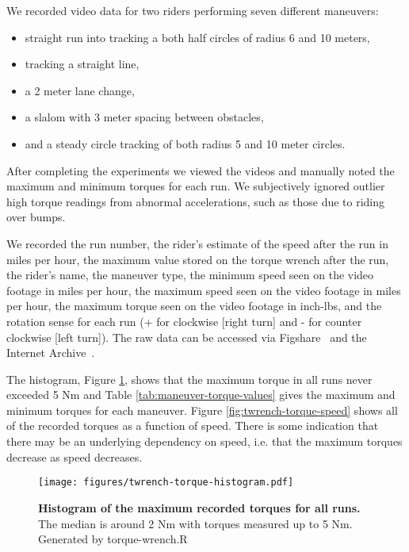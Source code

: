 \documentclass[10pt]{article}
\begin{document}
We recorded video data for two riders performing seven different maneuvers:

\begin{itemize}
  \item straight run into tracking a both half circles of radius 6 and 10
    meters,
  \item tracking a straight line,
  \item a 2 meter lane change,
  \item a slalom with 3 meter spacing between obstacles,
  \item and a steady circle tracking of both radius 5 and 10 meter circles.
\end{itemize}

After completing the experiments we viewed the videos and manually noted the
maximum and minimum torques for each run. We subjectively ignored outlier high
torque readings from abnormal accelerations, such as those due to riding over
bumps.

We recorded the run number, the rider’s estimate of the speed after the run in
miles per hour, the maximum value stored on the torque wrench after the run,
the rider’s name, the maneuver type, the minimum speed seen on the video
footage in miles per hour, the maximum speed seen on the video footage in miles
per hour, the maximum torque seen on the video footage in inch-lbs, and the
rotation sense for each run (+ for clockwise [right turn] and - for counter
clockwise [left turn]). The raw data can be accessed via Figshare~\cite{}
and the Internet Archive~\cite{}.

The histogram, Figure \ref{fig:twrench-torque-histogram}, shows that the
maximum torque in all runs never exceeded 5 Nm and Table
\ref{tab:maneuver-torque-values} gives the maximum and minimum torques for each
maneuver. Figure \ref{fig:twrench-torque-speed} shows all of the recorded
torques as a function of speed. There is some indication that there may be an
underlying dependency on speed, i.e. that the maximum torques decrease as speed
decreases.

\begin{figure}
  \centering
  \texttt{[image: figures/twrench-torque-histogram.pdf]}
  \caption{{\bf Histogram of the maximum recorded torques for all runs.}
    The median is around 2 Nm with torques measured up to 5 Nm. Generated by
    torque-wrench.R}
  \label{fig:twrench-torque-histogram}
\end{figure}
\end{document}
